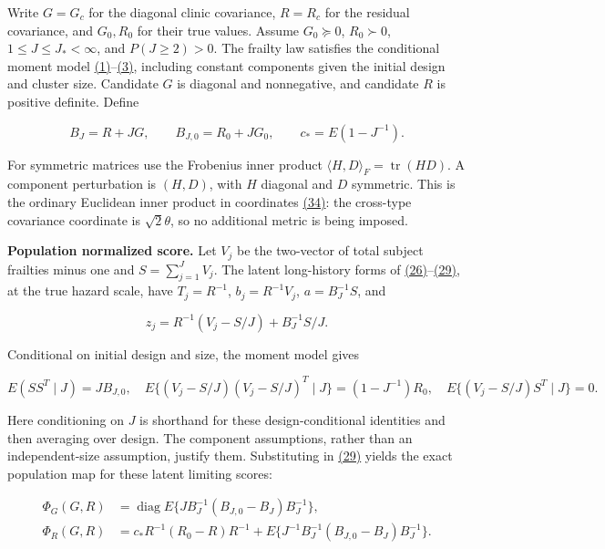 \documentclass[11pt]{article}
\begin{document}
Write \(G=G_c\) for the diagonal clinic covariance, \(R=R_c\) for the residual covariance, and \(G_0,R_0\) for their true values. Assume \(G_0\succeq0\), \(R_0\succ0\), \(1\leq J\leq J_*<\infty\), and \(P(J\geq2)>0\). The frailty law satisfies the conditional moment model \hyperref[eq:1]{(1)}--\hyperref[eq:3]{(3)}, including constant components given the initial design and cluster size. Candidate \(G\) is diagonal and nonnegative, and candidate \(R\) is positive definite. Define

\begin{equation*}
B_J=R+JG,\qquad B_{J,0}=R_0+JG_0,\qquad c_*=E(1-J^{-1}).\tag{L.2}\label{eq:L.2}
\end{equation*}

For symmetric matrices use the Frobenius inner product \(\langle H,D\rangle_F=\operatorname{tr}(HD)\). A component perturbation is \((H,D)\), with \(H\) diagonal and \(D\) symmetric. This is the ordinary Euclidean inner product in coordinates \hyperref[eq:34]{(34)}: the cross-type covariance coordinate is \(\sqrt2\theta\), so no additional metric is being imposed.

\textbf{Population normalized score.} Let \(V_j\) be the two-vector of total subject frailties minus one and \(S=\sum_{j=1}^J V_j\). The latent long-history forms of \hyperref[eq:26]{(26)}--\hyperref[eq:29]{(29)}, at the true hazard scale, have \(T_j=R^{-1}\), \(b_j=R^{-1}V_j\), \(a=B_J^{-1}S\), and

\begin{equation*}
z_j=R^{-1}(V_j-S/J)+B_J^{-1}S/J.\tag{L.3}\label{eq:L.3}
\end{equation*}

Conditional on initial design and size, the moment model gives

\begin{equation*}
E(SS^T\mid J)=J B_{J,0},\quad
E\{(V_j-S/J)(V_j-S/J)^T\mid J\}=(1-J^{-1})R_0,\quad
E\{(V_j-S/J)S^T\mid J\}=0.\tag{L.4}\label{eq:L.4}
\end{equation*}

Here conditioning on \(J\) is shorthand for these design-conditional identities and then averaging over design. The component assumptions, rather than an independent-size assumption, justify them. Substituting in \hyperref[eq:29]{(29)} yields the exact population map for these latent limiting scores:

\begin{equation*}
\begin{aligned}
\Phi_G(G,R)&=\operatorname{diag}E\{J B_J^{-1}(B_{J,0}-B_J)B_J^{-1}\},\\
\Phi_R(G,R)&=c_*R^{-1}(R_0-R)R^{-1}
 +E\{J^{-1}B_J^{-1}(B_{J,0}-B_J)B_J^{-1}\}.
\end{aligned}\tag{L.5}\label{eq:L.5}
\end{equation*}
\end{document}
